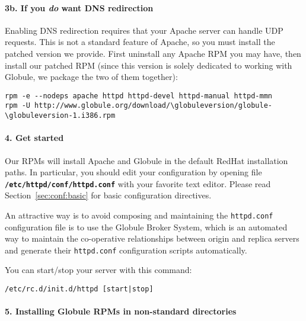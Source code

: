 \documentclass[10pt,a4paper]{article}
\makeatletter
\newcommand{\globuleversion}{1.3.1}
\newenvironment{p}{\@open{P}{}}{\@close{P}}
\newenvironment{p}{}{\par}
\makeatother
\begin{document}
\paragraph*{3b. If you \emph{do} want DNS redirection}

\begin{p}
Enabling DNS redirection requires that your Apache server can handle UDP
requests. This is not a standard feature of Apache, so you must install the
patched version we provide. First uninstall any Apache RPM you may have, then
install our patched RPM (since this version is solely dedicated to working
with Globule, we package the two of them together):
\end{p}

\begin{Verbatim}
rpm -e --nodeps apache httpd httpd-devel httpd-manual httpd-mmn
rpm -U http://www.globule.org/download/\globuleversion/globule-\globuleversion-1.i386.rpm 
\end{Verbatim}

\paragraph*{4. Get started}

\begin{p}
Our RPMs will install Apache and Globule in the default RedHat installation
paths. In particular, you should edit your configuration by opening file
{\tt\bf /etc/httpd/conf/httpd.conf} with your favorite text editor. Please
read Section~\ref{sec:conf:basic} for basic configuration directives.
\end{p}

\begin{p}
An attractive way is to avoid composing and maintaining the
\texttt{httpd.conf} configuration file is to use the Globule Broker System,
which is an automated way to maintain the co-operative relationships between
origin and replica servers and generate their \texttt{httpd.conf}
configuration scripts automatically.
\end{p}
  
\begin{p}
You can start/stop your server with this command:
\end{p}

\begin{Verbatim}
/etc/rc.d/init.d/httpd [start|stop]
\end{Verbatim}

\paragraph*{5. Installing Globule RPMs in non-standard directories}
\end{document}
